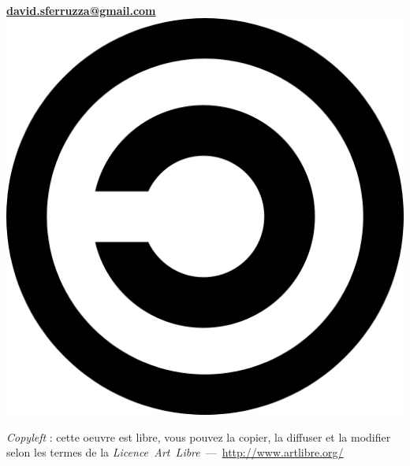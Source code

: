 \begin{titlepage}
\begin{center}
\begin{minipage}[c]{10cm}
	\begin{center}
	\textbf{\titre}
	\linebreak
	\linebreak
	\moi\\
	\textbf{\href{mailto:david.sferruzza@gmail.com}{david.sferruzza@gmail.com}}
	\linebreak
	\linebreak
	\linebreak
	\linebreak
	\includegraphics[scale=.05]{images/copyleft.png} 
	\end{center}
	\textit{Copyleft} : cette oeuvre est libre, vous pouvez la copier,
	la diffuser et la modifier selon les termes de la
	\textit{Licence~Art~Libre}~---~\url{http://www.artlibre.org/}
\end{minipage}
\end{center}
\vfill ~
\end{titlepage}
